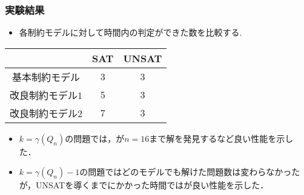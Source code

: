 \documentclass[dvipdfmx,10pt]{beamer}
\begin{document}
%
%

\begin{frame}\frametitle{実験結果}
 \begin{itemize}
  \item 各制約モデルに対して時間内の判定ができた数を比較する.
 \end{itemize}
 \begin{block}{}
  \begin{table}[ht]
   \centering
   \begin{tabular}{c|c|c}
    &SAT &UNSAT \\ \hline
    基本制約モデル &3 &3 \\
    改良制約モデル1 &5 &3 \\
    改良制約モデル2 &{\color{red}7} &{\color{red}3} \\ \hline
   \end{tabular}
  \end{table}
  \begin{itemize}
   \item $k=\gamma (Q_{n})$の問題では，が$n=16$まで解を発見するなど良い性能を示した．
   \item $k=\gamma (Q_{n})-1$の問題ではどのモデルでも解けた問題数は変わらなかったが，UNSATを導くまでにかかった時間ではが良い性能を示した．
  \end{itemize}
 \end{block}
\end{frame}
\end{document}
